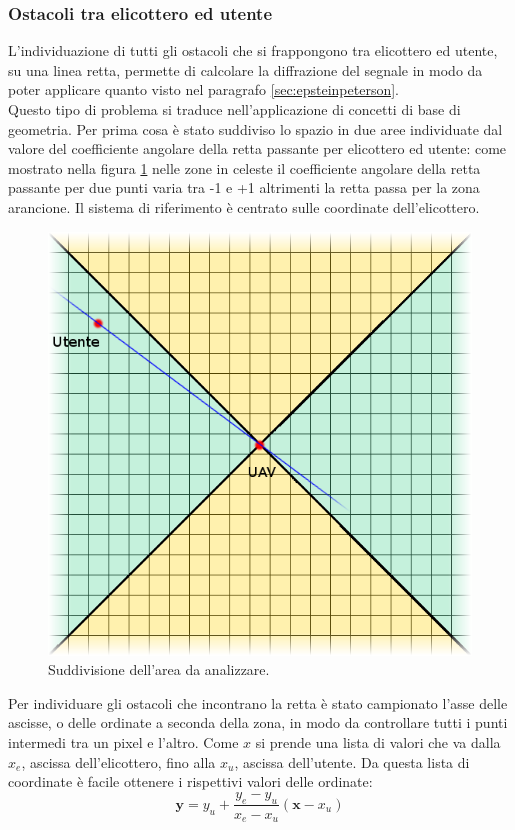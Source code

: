 \subsubsection{Ostacoli tra elicottero ed utente}
L'individuazione di tutti gli ostacoli che si frappongono tra elicottero ed utente, su una linea retta, permette di calcolare la 
diffrazione del segnale in modo da poter applicare quanto visto nel paragrafo \ref{sec:epsteinpeterson}. \\
Questo tipo di problema si traduce nell'applicazione di concetti di base di geometria. Per prima cosa è stato suddiviso lo spazio in 
due aree individuate dal valore del coefficiente angolare della retta passante per elicottero ed utente: come mostrato nella figura
\ref{img:areagriglia} nelle zone in celeste il coefficiente angolare della retta passante per due punti varia tra -1 e +1 altrimenti la 
retta passa per la zona arancione. Il sistema di riferimento è centrato sulle coordinate dell'elicottero.
\begin{figure}[h]
\centering
\includegraphics[height=0.7\textwidth]{Immagini/areagriglia}
\caption{Suddivisione dell'area da analizzare.}
\label{img:areagriglia}
\end{figure}
Per individuare gli ostacoli che incontrano la retta è stato campionato l'asse delle ascisse, o delle ordinate a seconda della zona, in
modo da controllare tutti i punti intermedi tra un pixel e l'altro. Come $x$ si prende una lista di valori che va dalla $x_{e}$, ascissa
dell'elicottero, fino alla $x_{u}$, ascissa dell'utente. Da questa lista di coordinate è facile ottenere i rispettivi valori delle 
ordinate:
\begin{equation}
\textbf{y} = y_{u} + \frac{y_{e}-y_{u}}{x_{e}-x_{u}}(\textbf{x}-x_{u})
\label{eq:rettaduepunti}
\end{equation}
